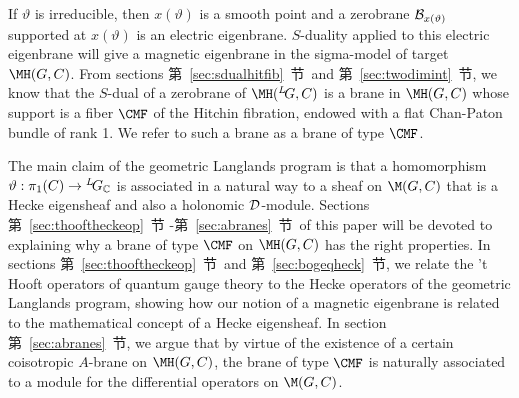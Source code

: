 If $\vartheta$ is irreducible, then $x(\vartheta)$ is a smooth
point and a zerobrane ${\cal B}_{x(\vartheta)}$ supported at
$x(\vartheta)$ is an electric eigenbrane.  $S$-duality applied to
this electric eigenbrane will give a magnetic eigenbrane in the
sigma-model of target $\MH(G,C)$.  {}From sections 第~\ref{sec:sdualhitfib}~节\
and 第~\ref{sec:twodimint}~节, we know that the $S$-dual of a zerobrane of
$\MH(^L\negthinspace G,C)$ is a brane in $\MH(G,C)$ whose support
is a fiber ${\CMF}$ of the Hitchin fibration, endowed with a flat
Chan-Paton bundle of rank 1.  We refer to such a brane as a brane
of type ${\CMF}$.

The main claim of the geometric Langlands program is that a
homomorphism $\vartheta:\pi_1(C)\to {}^L\negthinspace G_{\Bbb{C}}$
is associated in a natural way to a sheaf on $\M(G,C)$ that is a
Hecke eigensheaf and also a holonomic ${\cal D}$-module.  Sections
第~\ref{sec:thooftheckeop}~节 -第~\ref{sec:abranes}~节\ of this paper will be devoted to
explaining why a brane of type ${\CMF}$ on $\MH(G,C)$ has the
right properties. In sections 第~\ref{sec:thooftheckeop}~节\ and 第~\ref{sec:bogeqheck}~节, we
relate the 't Hooft operators of quantum gauge theory  to the
Hecke operators of the geometric Langlands program, showing how
our notion of a magnetic eigenbrane is related to the mathematical
concept of a Hecke eigensheaf.  In section 第~\ref{sec:abranes}~节, we argue that
by virtue of the existence of a certain coisotropic $A$-brane on
$\MH(G,C)$, the brane of type ${\CMF}$ is naturally associated to
a module for the differential operators on $\M(G,C)$.
